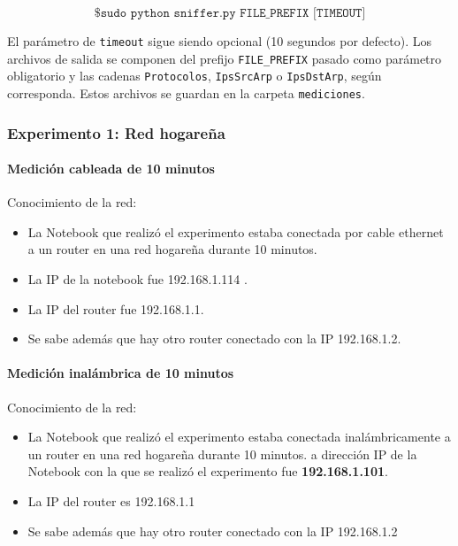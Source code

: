 \[
\texttt{\$ sudo python sniffer.py FILE\_PREFIX [TIMEOUT]}
\]

El parámetro de \texttt{timeout} sigue siendo opcional (10 segundos por defecto). Los archivos de salida
se componen del prefijo \texttt{FILE\_PREFIX} pasado como parámetro obligatorio y las cadenas \texttt{Protocolos},
\texttt{IpsSrcArp} o \texttt{IpsDstArp}, según corresponda. Estos archivos se guardan en la carpeta \texttt{mediciones}.


\subsubsection{Experimento 1: Red hogareña}
\paragraph{Medición cableada de 10 minutos}

Conocimiento de la red:
\begin{itemize} 
\item La Notebook que realizó el experimento estaba conectada por cable ethernet a un router en una red hogareña durante 10 minutos.
\item La IP de la notebook fue 192.168.1.114 .
\item La IP del router fue 192.168.1.1.
\item Se sabe además que hay otro router conectado con la IP 192.168.1.2.
\end{itemize}

\paragraph{Medición inalámbrica de 10 minutos}

Conocimiento de la red:
\begin{itemize}
\item La Notebook que realizó el experimento estaba conectada inalámbricamente a un router en una red hogareña durante 10 minutos.
a dirección IP de la Notebook con la que se realizó el experimento fue \textbf{192.168.1.101}.
\item La IP del router es 192.168.1.1
\item Se sabe además que hay otro router conectado con la IP 192.168.1.2
\end{itemize}


